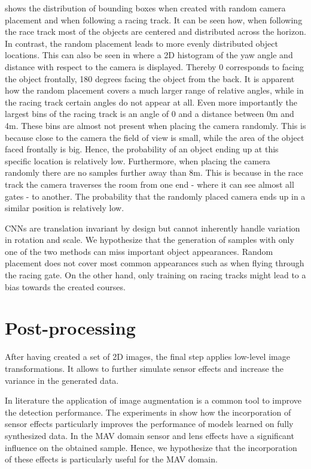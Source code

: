  shows the distribution of bounding boxes when created with random camera placement and when following a racing track. It can be seen how, when following the race track most of the objects are centered and distributed across the horizon. In contrast, the random placement leads to more evenly distributed object locations. This can also be seen in  where a 2D histogram of the yaw angle and distance with respect to the camera is displayed. Thereby 0 corresponds to facing the object frontally, 180 degrees facing the object from the back. It is apparent how the random placement covers a much larger range of relative angles, while in the racing track certain angles do not appear at all. Even more importantly the largest bins of the racing track is an angle of 0 and a distance between 0m and 4m. These bins are almost not present when placing the camera randomly. This is because close to the camera the field of view is small, while the area of the object faced frontally is big. Hence, the probability of an object ending up at this specific location is relatively low. Furthermore, when placing the camera randomly there are no samples further away than 8m. This is because in the race track the camera traverses the room from one end - where it can see almost all gates - to another. The probability that the randomly placed camera ends up in a similar position is relatively low.

\acp{CNN} are translation invariant by design but cannot inherently handle variation in rotation and scale. We hypothesize that the generation of samples with only one of the two methods can miss important object appearances. Random placement does not cover most common appearances such as when flying through the racing gate. On the other hand, only training on racing tracks might lead to a bias towards the created courses.

\section{Post-processing}

After having created a set of 2D images, the final step applies low-level image transformations. It allows to further simulate sensor effects and increase the variance in the generated data.

In literature \cite{Krizhevsky2012a,Howard2013,Redmon,Liu} the application of image augmentation is a common tool to improve the detection performance. The experiments in \cite{Carlson2018} show how the incorporation of sensor effects particularly improves the performance of models learned on fully synthesized data. In the \ac{MAV} domain sensor and lens effects have a significant influence on the obtained sample. Hence, we hypothesize that the incorporation of these effects is particularly useful for the \ac{MAV} domain.

